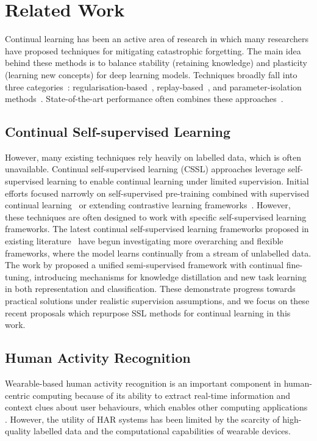 \section{Related Work}
\label{related}
Continual learning has been an active area of research in which many researchers have proposed techniques for mitigating catastrophic forgetting. The main idea behind these methods is to balance stability (retaining knowledge) and plasticity (learning new concepts) for deep learning models. Techniques broadly fall into three categories~\cite{de2021continual}: regularisation-based~\cite{kirkpatrick2017overcoming, li2017learning, shin2017continual, wu2019large}, replay-based~\cite{rebuffi2017icarl, chaudhry2018efficient, ostapenko2019learning, buzzega2020dark}, and parameter-isolation methods~\cite{rusu2016progressive, serra2018overcoming}. State-of-the-art performance often combines these approaches~\cite{mittal2021essentials}.

\subsection{Continual Self-supervised Learning}
However, many existing techniques rely heavily on labelled data, which is often unavailable.  Continual self-supervised learning (CSSL) approaches leverage self-supervised learning to enable continual learning under limited supervision. Initial efforts focused narrowly on self-supervised pre-training combined with supervised continual learning~\cite{gallardo2021self, caccia2022special} or extending contrastive learning frameworks~\cite{cha2021co2l, madaan2021rethinking}. However, these techniques are often designed to work with specific self-supervised learning frameworks. The latest continual self-supervised learning frameworks proposed in existing literature~\cite{de2021continual, fini2022self} have begun investigating more overarching and flexible frameworks, where the model learns continually from a stream of unlabelled data. The work by \cite{tang2023practical} proposed a unified semi-supervised framework with continual fine-tuning, introducing mechanisms for knowledge distillation and new task learning in both representation and classification. These demonstrate progress towards practical solutions under realistic supervision assumptions, and we focus on these recent proposals which repurpose SSL methods for continual learning in this work.

\subsection{Human Activity Recognition}
Wearable-based human activity recognition is an important component in human-centric computing because of its ability to extract real-time information and context clues about user behaviours, which enables other computing applications \cite{choi2016understanding, jaimes2015corredor}. However, the utility of HAR systems has been limited by the scarcity of high-quality labelled data and the computational capabilities of wearable devices.

